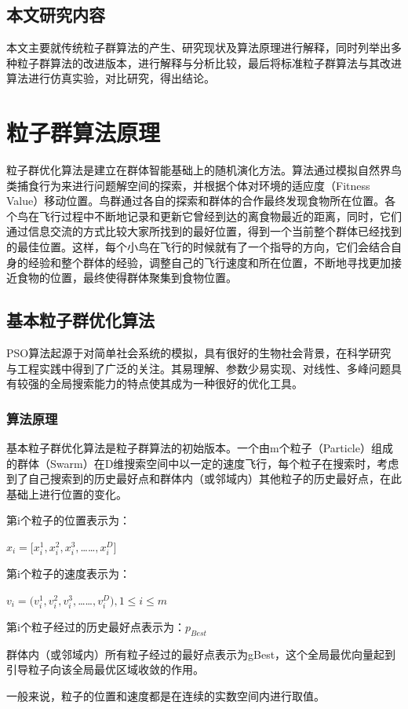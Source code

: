 \subsection{本文研究内容}
本文主要就传统粒子群算法的产生、研究现状及算法原理进行解释，同时列举出多种粒子群算法的改进版本，进行解释与分析比较，最后将标准粒子群算法与其改进算法进行仿真实验，对比研究，得出结论。
\section{粒子群算法原理}
粒子群优化算法是建立在群体智能基础上的随机演化方法。算法通过模拟自然界鸟类捕食行为来进行问题解空间的探索，并根据个体对环境的适应度（Fitness Value）移动位置。鸟群通过各自的探索和群体的合作最终发现食物所在位置。各个鸟在飞行过程中不断地记录和更新它曾经到达的离食物最近的距离，同时，它们通过信息交流的方式比较大家所找到的最好位置，得到一个当前整个群体已经找到的最佳位置。这样，每个小鸟在飞行的时候就有了一个指导的方向，它们会结合自身的经验和整个群体的经验，调整自己的飞行速度和所在位置，不断地寻找更加接近食物的位置，最终使得群体聚集到食物位置。

\subsection{基本粒子群优化算法}
PSO算法起源于对简单社会系统的模拟，具有很好的生物社会背景，在科学研究与工程实践中得到了广泛的关注。其易理解、参数少易实现、对线性、多峰问题具有较强的全局搜索能力的特点使其成为一种很好的优化工具。
\subsubsection{算法原理}
基本粒子群优化算法是粒子群算法的初始版本。一个由m个粒子（Particle）组成的群体（Swarm）在D维搜索空间中以一定的速度飞行，每个粒子在搜索时，考虑到了自己搜索到的历史最好点和群体内（或邻域内）其他粒子的历史最好点，在此基础上进行位置的变化。

 \noindent 第i个粒子的位置表示为：
 
 \centerline{$x_i=[x_i^1,x_i^2,x_i^3,$……$,x_i^D]$}


 \noindent 第i个粒子的速度表示为：
 
 \centerline{$v_i=(v_i^1,v_i^2,v_i^3,$……$,v_i^D),1\leq i\leq m$} 

\noindent 第i个粒子经过的历史最好点表示为：$p_{Best}$

 群体内（或邻域内）所有粒子经过的最好点表示为gBest，这个全局最优向量起到引导粒子向该全局最优区域收敛的作用。

一般来说，粒子的位置和速度都是在连续的实数空间内进行取值。
